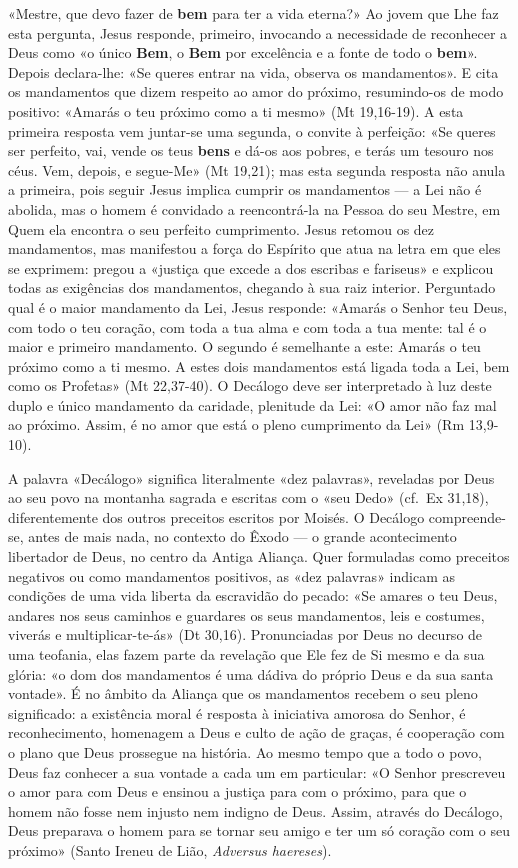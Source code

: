 «Mestre, que devo fazer de \textbf{bem} para ter a vida eterna?» Ao jovem que Lhe faz esta pergunta, Jesus responde, primeiro, invocando a necessidade de reconhecer a Deus como «o único \textbf{Bem}, o \textbf{Bem} por excelência e a fonte de todo o \textbf{bem}». Depois declara-lhe: «Se queres entrar na vida, observa os mandamentos». E cita os mandamentos que dizem respeito ao amor do próximo, resumindo-os de modo positivo: «Amarás o teu próximo como a ti mesmo» (Mt 19,16-19). A esta primeira resposta vem juntar-se uma segunda, o convite à perfeição: «Se queres ser perfeito, vai, vende os teus \textbf{bens} e dá-os aos pobres, e terás um tesouro nos céus. Vem, depois, e segue-Me» (Mt 19,21); mas esta segunda resposta não anula a primeira, pois seguir Jesus implica cumprir os mandamentos --- a Lei não é abolida, mas o homem é convidado a reencontrá-la na Pessoa do seu Mestre, em Quem ela encontra o seu perfeito cumprimento. Jesus retomou os dez mandamentos, mas manifestou a força do Espírito que atua na letra em que eles se exprimem: pregou a «justiça que excede a dos escribas e fariseus» e explicou todas as exigências dos mandamentos, chegando à sua raiz interior. Perguntado qual é o maior mandamento da Lei, Jesus responde: «Amarás o Senhor teu Deus, com todo o teu coração, com toda a tua alma e com toda a tua mente: tal é o maior e primeiro mandamento. O segundo é semelhante a este: Amarás o teu próximo como a ti mesmo. A estes dois mandamentos está ligada toda a Lei, bem como os Profetas» (Mt 22,37-40). O Decálogo deve ser interpretado à luz deste duplo e único mandamento da caridade, plenitude da Lei: «O amor não faz mal ao próximo. Assim, é no amor que está o pleno cumprimento da Lei» (Rm 13,9-10).

A palavra «Decálogo» significa literalmente «dez palavras», reveladas por Deus ao seu povo na montanha sagrada e escritas com o «seu Dedo» (cf.~Ex 31,18), diferentemente dos outros preceitos escritos por Moisés. O Decálogo compreende-se, antes de mais nada, no contexto do Êxodo --- o grande acontecimento libertador de Deus, no centro da Antiga Aliança. Quer formuladas como preceitos negativos ou como mandamentos positivos, as «dez palavras» indicam as condições de uma vida liberta da escravidão do pecado: «Se amares o teu Deus, andares nos seus caminhos e guardares os seus mandamentos, leis e costumes, viverás e multiplicar-te-ás» (Dt 30,16). Pronunciadas por Deus no decurso de uma teofania, elas fazem parte da revelação que Ele fez de Si mesmo e da sua glória: «o dom dos mandamentos é uma dádiva do próprio Deus e da sua santa vontade». É no âmbito da Aliança que os mandamentos recebem o seu pleno significado: a existência moral é resposta à iniciativa amorosa do Senhor, é reconhecimento, homenagem a Deus e culto de ação de graças, é cooperação com o plano que Deus prossegue na história. Ao mesmo tempo que a todo o povo, Deus faz conhecer a sua vontade a cada um em particular: «O Senhor prescreveu o amor para com Deus e ensinou a justiça para com o próximo, para que o homem não fosse nem injusto nem indigno de Deus. Assim, através do Decálogo, Deus preparava o homem para se tornar seu amigo e ter um só coração com o seu próximo» (Santo Ireneu de Lião, \textit{Adversus haereses}).

